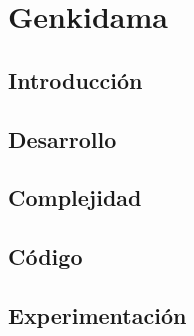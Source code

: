 \section{Genkidama}

	\subsection{Introducción}

	
    \subsection{Desarrollo}


    \subsection{Complejidad}


    \subsection{Código}


    \subsection{Experimentación}
